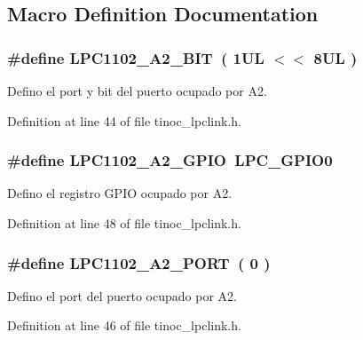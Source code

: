 \subsection{Macro Definition Documentation}
\subsubsection[{\texorpdfstring{L\+P\+C1102\+\_\+\+A2\+\_\+\+B\+IT}{LPC1102_A2_BIT}}]{\setlength{\rightskip}{0pt plus 5cm}\#define L\+P\+C1102\+\_\+\+A2\+\_\+\+B\+IT~( 1\+U\+L $<$$<$ 8\+U\+L )}\hypertarget{group___p_i_n_a2_ga468d2953fb3f21789957ee47f63e7c63}{}\label{group___p_i_n_a2_ga468d2953fb3f21789957ee47f63e7c63}


Defino el port y bit del puerto ocupado por A2. 



Definition at line 44 of file tinoc\+\_\+lpclink.\+h.

\subsubsection[{\texorpdfstring{L\+P\+C1102\+\_\+\+A2\+\_\+\+G\+P\+IO}{LPC1102_A2_GPIO}}]{\setlength{\rightskip}{0pt plus 5cm}\#define L\+P\+C1102\+\_\+\+A2\+\_\+\+G\+P\+IO~L\+P\+C\+\_\+\+G\+P\+I\+O0}\hypertarget{group___p_i_n_a2_ga0d6606e66c7be93dff6911f06846baea}{}\label{group___p_i_n_a2_ga0d6606e66c7be93dff6911f06846baea}


Defino el registro G\+P\+IO ocupado por A2. 



Definition at line 48 of file tinoc\+\_\+lpclink.\+h.

\subsubsection[{\texorpdfstring{L\+P\+C1102\+\_\+\+A2\+\_\+\+P\+O\+RT}{LPC1102_A2_PORT}}]{\setlength{\rightskip}{0pt plus 5cm}\#define L\+P\+C1102\+\_\+\+A2\+\_\+\+P\+O\+RT~( 0 )}\hypertarget{group___p_i_n_a2_gaab2a521ccd24403022ea360f4ba721bc}{}\label{group___p_i_n_a2_gaab2a521ccd24403022ea360f4ba721bc}


Defino el port del puerto ocupado por A2. 



Definition at line 46 of file tinoc\+\_\+lpclink.\+h.

